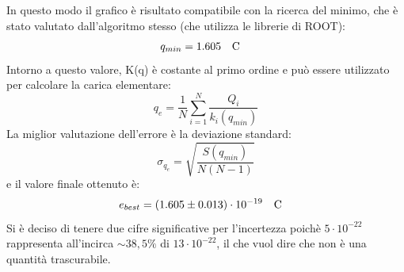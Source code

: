 \documentclass{article}
\begin{document}
    \begin{figure}[H]
    \centering
        \qquad
    \end{figure}

    
    In questo modo il grafico è risultato compatibile con la ricerca del minimo, che è stato valutato dall'algoritmo stesso (che utilizza le librerie di ROOT):
        \[ q_{min} = 1.605 \qq{C}\]
    Intorno a questo valore, K(q) è costante al primo ordine e può essere utilizzato per calcolare la carica elementare:
        \[q_e = \frac{1}{N}\sum_{i=1}^N\frac{Q_i}{k_i(q_{min})}\]
    La miglior valutazione dell'errore è la deviazione standard:
        \[\sigma_{q_e} = \sqrt{\frac{S(q_{min})}{N(N-1)}}\]
    e il valore finale ottenuto è:
          \[ e_{best} = (1.605 \pm 0.013)\cdot 10^{-19} \qq{C}
    \]
    Si è deciso di tenere due cifre significative per l'incertezza poichè $5\cdot10^{-22}$ rappresenta all'incirca $\sim 38,5\%$ di $13\cdot10^{-22}$, il che vuol dire che non è una quantità trascurabile.
\end{document}
